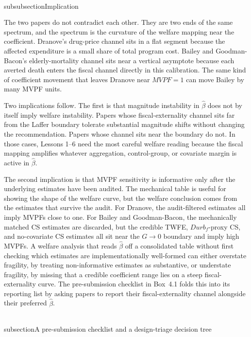 \documentclass[11pt]{article}
\begin{document}
\\subsubsection{Implication}

The two papers do not contradict each other. They are two ends of the same spectrum, and the spectrum is the curvature of the welfare mapping near the coefficient. Dranove's drug-price channel sits in a flat segment because the affected expenditure is a small share of total program cost. Bailey and Goodman-Bacon's elderly-mortality channel sits near a vertical asymptote because each averted death enters the fiscal channel directly in this calibration. The same kind of coefficient movement that leaves Dranove near \(MVPF=1\) can move Bailey by many MVPF units.

Two implications follow. The first is that magnitude instability in \(\hat\beta\) does not by itself imply welfare instability. Papers whose fiscal-externality channel sits far from the Laffer boundary tolerate substantial magnitude shifts without changing the recommendation. Papers whose channel sits near the boundary do not. In those cases, Lessons 1--6 need the most careful welfare reading because the fiscal mapping amplifies whatever aggregation, control-group, or covariate margin is active in \(\hat\beta\).

The second implication is that MVPF sensitivity is informative only after the underlying estimates have been audited. The mechanical table is useful for showing the shape of the welfare curve, but the welfare conclusion comes from the estimates that survive the audit. For Dranove, the audit-filtered estimates all imply MVPFs close to one. For Bailey and Goodman-Bacon, the mechanically matched CS estimates are discarded, but the credible TWFE, \(Durb_f\)-proxy CS, and no-covariate CS estimates all sit near the \(G\to0\) boundary and imply high MVPFs. A welfare analysis that reads \(\hat\beta\) off a consolidated table without first checking which estimates are implementationally well-formed can either overstate fragility, by treating non-informative estimates as substantive, or understate fragility, by missing that a credible coefficient range lies on a steep fiscal-externality curve. The pre-submission checklist in Box~4.1 folds this into its reporting list by asking papers to report their fiscal-externality channel alongside their preferred \(\hat\beta\).



\newpage
\\subsection{A pre-submission checklist and a design-triage decision tree}
\label{sec:applied_guide}
\end{document}
